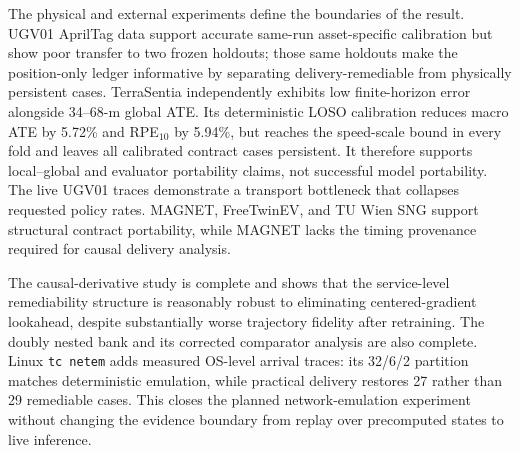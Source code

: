 \documentclass[journal,onecolumn]{IEEEtran}
\begin{document}
The physical and external experiments define the boundaries of the result. UGV01 AprilTag data support accurate same-run asset-specific calibration but show poor transfer to two frozen holdouts; those same holdouts make the position-only ledger informative by separating delivery-remediable from physically persistent cases. TerraSentia independently exhibits low finite-horizon error alongside 34--68-m global ATE. Its deterministic LOSO calibration reduces macro ATE by 5.72\% and RPE$_{10}$ by 5.94\%, but reaches the speed-scale bound in every fold and leaves all calibrated contract cases persistent. It therefore supports local--global and evaluator portability claims, not successful model portability. The live UGV01 traces demonstrate a transport bottleneck that collapses requested policy rates. MAGNET, FreeTwinEV, and TU Wien SNG support structural contract portability, while MAGNET lacks the timing provenance required for causal delivery analysis.

The causal-derivative study is complete and shows that the service-level remediability structure is reasonably robust to eliminating centered-gradient lookahead, despite substantially worse trajectory fidelity after retraining. The doubly nested bank and its corrected comparator analysis are also complete. Linux \texttt{tc netem} adds measured OS-level arrival traces: its 32/6/2 partition matches deterministic emulation, while practical delivery restores 27 rather than 29 remediable cases. This closes the planned network-emulation experiment without changing the evidence boundary from replay over precomputed states to live inference.
\end{document}
